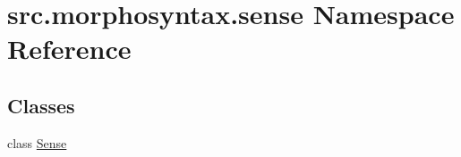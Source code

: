 \hypertarget{namespacesrc_1_1morphosyntax_1_1sense}{\section{src.\+morphosyntax.\+sense Namespace Reference}
\label{namespacesrc_1_1morphosyntax_1_1sense}
}
\subsection*{Classes}
\begin{DoxyCompactItemize}
\item 
class \hyperlink{classsrc_1_1morphosyntax_1_1sense_1_1_sense}{Sense}
\end{DoxyCompactItemize}
